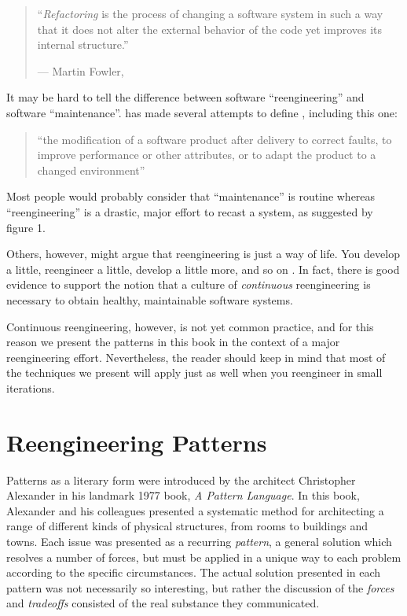 \documentclass[a4paper,10pt,twoside]{book}
\begin{document}
\begin{quotation}
\noindent
``\emph{Refactoring} is the process of changing a software system in such a way that it does not alter the external behavior of the code yet improves its internal structure.''

\hfill --- Martin Fowler, \cite{Fowl99a}
\end{quotation}

It may be hard to tell the difference between software ``reengineering'' and software ``maintenance''.  has made several attempts to define , including this one:

\begin{quotation}
\noindent
``the modification of a software product after delivery to correct faults, to improve performance or other attributes, or to adapt the product to a changed environment'' 
\end{quotation}

Most people would probably consider that ``maintenance'' is routine whereas ``reengineering'' is a drastic, major effort to recast a system, as suggested by figure 1.

Others, however, might argue that reengineering is just a way of life. You develop a little, reengineer a little, develop a little more, and so on \cite{Beck00a}. In fact, there is good evidence to support the notion that a culture of \emph{continuous} reengineering is necessary to obtain healthy, maintainable software systems.

Continuous reengineering, however, is not yet common practice, and for this reason we present the patterns in this book in the context of a major reengineering effort. Nevertheless, the reader should keep in mind that most of the techniques we present will apply just as well when you reengineer in small iterations.

\section{Reengineering Patterns}

Patterns as a literary form were introduced by the architect Christopher Alexander in his landmark 1977 book, \emph{A Pattern Language}. In this book, Alexander and his colleagues presented a systematic method for architecting a range of different kinds of physical structures, from rooms to buildings and towns. Each issue was presented as a recurring \emph{pattern}, a general solution which resolves a number of forces, but must be applied in a unique way to each problem according to the specific circumstances. The actual solution presented in each pattern was not necessarily so interesting, but rather the discussion of the \emph{forces} and \emph{tradeoffs} consisted of the real substance they communicated.
\end{document}
